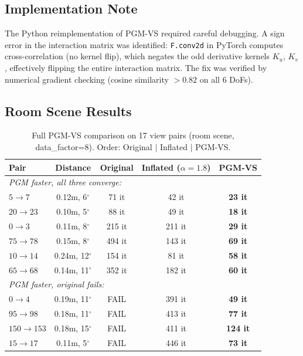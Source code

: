 \documentclass[11pt]{article}
\begin{document}
\subsection{Implementation Note}
The Python reimplementation of PGM-VS required careful debugging. A sign error in the interaction matrix was identified: \texttt{F.conv2d} in PyTorch computes cross-correlation (no kernel flip), which negates the odd derivative kernels $K_u$, $K_v$, effectively flipping the entire interaction matrix. The fix was verified by numerical gradient checking (cosine similarity $> 0.82$ on all 6 DoFs).

\subsection{Room Scene Results}

\begin{table}[h!]
\centering
\caption{Full PGM-VS comparison on 17 view pairs (room scene, data\_factor=8). Order: Original $|$ Inflated $|$ PGM-VS.}
\label{tab:pgm_full}
\small
\begin{tabular}{lc|ccc}
\toprule
\textbf{Pair} & \textbf{Distance} & \textbf{Original} & \textbf{Inflated ($\alpha\!=\!1.8$)} & \textbf{PGM-VS} \\
\midrule
\multicolumn{5}{l}{\emph{PGM faster, all three converge:}} \\
$5 \to 7$     & 0.12m, 6$^\circ$  & 71 it   & 42 it   & \textbf{23 it}  \\
$20 \to 23$   & 0.10m, 5$^\circ$  & 88 it   & 49 it   & \textbf{18 it}  \\
$0 \to 3$     & 0.11m, 8$^\circ$  & 215 it  & 211 it  & \textbf{29 it}  \\
$75 \to 78$   & 0.15m, 8$^\circ$  & 494 it  & 143 it  & \textbf{69 it}  \\
$10 \to 14$   & 0.24m, 12$^\circ$ & 154 it  & 81 it   & \textbf{58 it}  \\
$65 \to 68$   & 0.14m, 11$^\circ$ & 352 it  & 182 it  & \textbf{60 it}  \\
\midrule
\multicolumn{5}{l}{\emph{PGM faster, original fails:}} \\
$0 \to 4$     & 0.19m, 11$^\circ$ & FAIL    & 391 it  & \textbf{49 it}  \\
$95 \to 98$   & 0.18m, 11$^\circ$ & FAIL    & 413 it  & \textbf{77 it}  \\
$150 \to 153$ & 0.18m, 15$^\circ$ & FAIL    & 411 it  & \textbf{124 it} \\
$15 \to 17$   & 0.11m, 5$^\circ$  & FAIL    & 446 it  & \textbf{73 it}  \\

\end{tabular}
\end{table}
\end{document}
